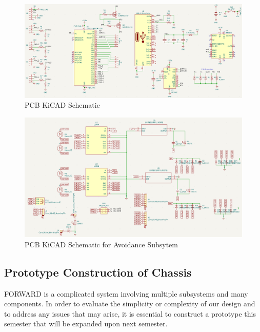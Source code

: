 \begin{figure}[H]
	\centering
	\includegraphics[width=\textwidth]{./Images/PCB1-sch.png}
	\caption{\label{fig:pcb-sch}PCB KiCAD Schematic}
\end{figure}


\begin{figure}[H]
	\centering
	\includegraphics[width=\textwidth]{./Images/pcb-avoidance-headers2.png}
	\caption{\label{fig:pcb-motor}PCB KiCAD Schematic for Avoidance Subsytem}
\end{figure}

\subsection{Prototype Construction of Chassis}
\noindent FORWARD is a complicated system involving multiple subsystems and many components. In order to evaluate the simplicity or complexity of our design and to address any issues that may arise, it is essential to construct a prototype this semester that will be expanded upon next semester.\\

